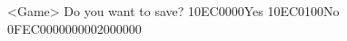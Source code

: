 <Game> Do you want to save? {10}{EC}{00}{00}Yes {10}{EC}{01}{00}No {0F}{EC}{00}{00}{00}{00}{02}{00}{00}{00}
